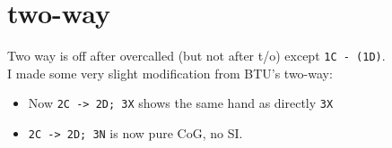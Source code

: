 \section{two-way}

Two way is off after overcalled (but not after t/o) except \texttt{1C - (1D)}. \\
I made some very slight modification from BTU's two-way:
\begin{itemize}
    \setlength\itemsep{0pt}
    \item Now \texttt{2C -> 2D; 3X} shows the same hand as directly \texttt{3X}
    \item \texttt{2C -> 2D; 3N} is now pure CoG, no SI.
\end{itemize}

